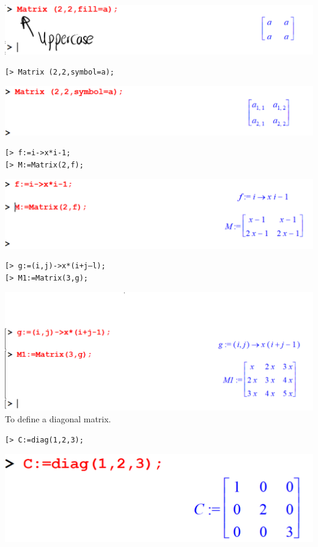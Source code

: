 \documentclass[
]{book}
\theoremstyle{definition}
\theoremstyle{definition}
\theoremstyle{definition}
\theoremstyle{definition}
\theoremstyle{remark}
\begin{document}
\includegraphics{figures/Lesson 4/fig5.png}

\begin{verbatim}
[> Matrix (2,2,symbol=a);
\end{verbatim}

\includegraphics{figures/Lesson 4/fig6.png}

\begin{verbatim}
[> f:=i->x*i-1;
[> M:=Matrix(2,f);
\end{verbatim}

\includegraphics{figures/Lesson 4/fig7.png}

\begin{verbatim}
[> g:=(i,j)->x*(i+j—l);
[> M1:=Matrix(3,g);
\end{verbatim}

\includegraphics{figures/Lesson 4/fig8.png}
To define a diagonal matrix.

\begin{verbatim}
[> C:=diag(1,2,3);
\end{verbatim}

\includegraphics{figures/Lesson 4/fig16.png}
\end{document}
